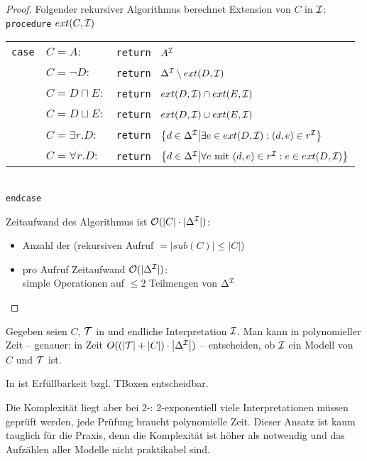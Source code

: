 \begin{proof}
    Folgender rekursiver Algorithmus berechnet Extension von $C$ in $\mathcal{I}$:\\
    \texttt{procedure} $ext(C, \mathcal{I})$\\
    \begin{tabular}{l l l}
        \texttt{case} & $C = A:$ & \texttt{return } $A^{\mathcal{I}}$\\
                      & $C = \neg D:$ & \texttt{return }
        $\Delta^{\mathcal{I}} \setminus ext(D, \mathcal{I})$\\
                      & $C = D \sqcap E:$ & \texttt{return }
        $ext(D, \mathcal{I}) \cap ext(E, \mathcal{I})$\\
                      & $C = D \sqcup E:$ & \texttt{return }
        $ext(D, \mathcal{I}) \cup ext(E, \mathcal{I})$\\
                      & $C = \exists r.D:$ & \texttt{return }
        $\left\{d\in \Delta^\MI \middle| \exists e\in ext(D, \MI) : (d, e) \in r^\MI\right\}$\\
                      & $C = \forall r.D:$ & \texttt{return }
        $\left\{d\in \Delta^\MI \middle| \forall e \text{ mit } (d, e) \in r^\MI : e\in ext(D, \MI)\right\}$\\
    \end{tabular}\\
    \texttt{endcase}

    Zeitaufwand des Algorithmus ist $\mathcal{O}(|C| \cdot |\Delta^{\mathcal{I}}|)$:
    \begin{itemize}
        \item Anzahl der (rekursiven Aufruf $= |sub(C)| \leq |C|$)
        \item pro Aufruf Zeitaufwand $\mathcal{O}(|\Delta^{\mathcal{I}}|)$: \\
            simple Operationen auf $\leq 2$ Teilmengen von $\Delta^{\mathcal{I}}$
    \end{itemize}
\end{proof}

\begin{korollar}
Gegeben seien $C$, $\mathcal{T}$ in \ALC und endliche Interpretation $\mathcal{I}$. Man kann in polynomieller Zeit -- genauer: in Zeit $O(\left( \left| \MT \right| + \left| C \right| \right) \cdot \left| \Delta^\MI \right|)$ -- entscheiden, ob $\mathcal{I}$ ein Modell von $C$ und $\mathcal{T}$ ist.
\end{korollar}

\begin{theorem}
In \ALC ist Erfüllbarkeit bzgl. TBoxen entscheidbar.
\end{theorem}

Die Komplexität liegt aber bei 2-\ExpTime: 2-exponentiell viele
Interpretationen müssen geprüft werden, jede Prüfung braucht polynomielle Zeit.
Dieser Ansatz ist kaum tauglich für die Praxis, denn die Komplexität ist höher
als notwendig und das Aufzählen aller Modelle nicht praktikabel sind.
